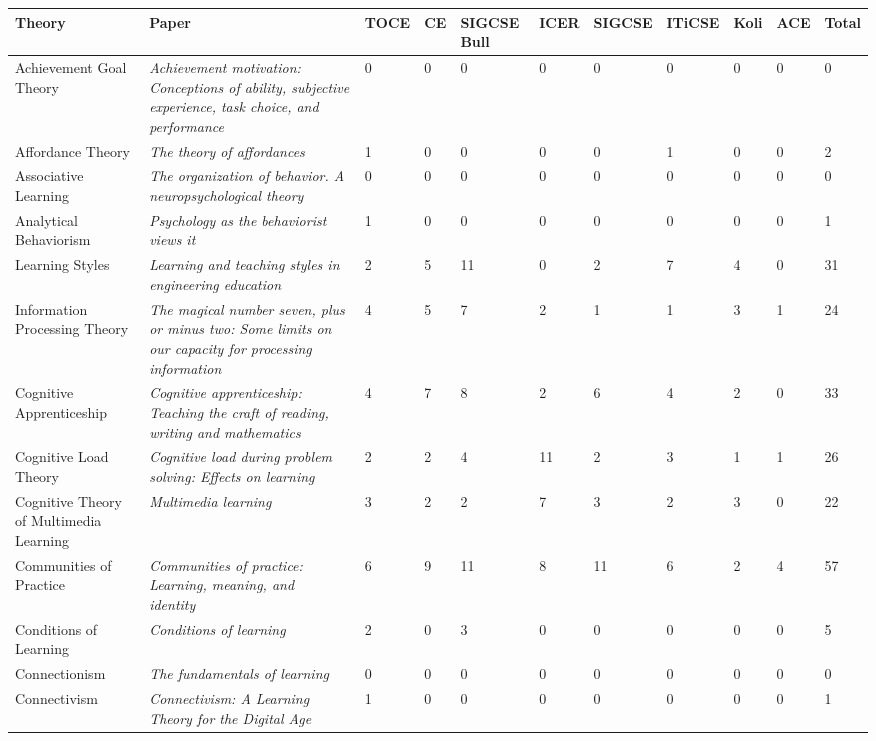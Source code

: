 \begin{table*}[t]
\begin{tabular}{p{3cm}p{5cm}lllllllll}
Theory&Paper&TOCE&CE&SIGCSE Bull&ICER&SIGCSE&ITiCSE&Koli&ACE&Total\\\hline
Achievement Goal Theory & \textit{Achievement motivation: Conceptions of ability, subjective experience, task choice, and performance}~\cite{nicholls1984achievement} & 0 & 0 & 0 & 0 & 0 & 0 & 0 & 0 & 0\\
Affordance Theory & \textit{The theory of affordances}~\cite{gibson1977theory} & 1 & 0 & 0 & 0 & 0 & 1 & 0 & 0 & 2\\
Associative Learning & \textit{The organization of behavior. A neuropsychological theory}~\cite{hebb1949organization} & 0 & 0 & 0 & 0 & 0 & 0 & 0 & 0 & 0\\
Analytical Behaviorism & \textit{Psychology as the behaviorist views it}~\cite{watson1913psychology} & 1 & 0 & 0 & 0 & 0 & 0 & 0 & 0 & 1\\
Learning Styles & \textit{Learning and teaching styles in engineering education}~\cite{felder1988learning} & 2 & 5 & 11 & 0 & 2 & 7 & 4 & 0 & 31\\
Information Processing Theory & \textit{The magical number seven, plus or minus two: Some limits on our capacity for processing information}~\cite{miller1956magical} & 4 & 5 & 7 & 2 & 1 & 1 & 3 & 1 & 24\\
Cognitive Apprenticeship & \textit{Cognitive apprenticeship: Teaching the craft of reading, writing and mathematics}~\cite{collins1988cognitive} & 4 & 7 & 8 & 2 & 6 & 4 & 2 & 0 & 33\\
Cognitive Load Theory & \textit{Cognitive load during problem solving: Effects on learning}~\cite{sweller1988cognitive} & 2 & 2 & 4 & 11 & 2 & 3 & 1 & 1 & 26\\
Cognitive Theory of Multimedia Learning & \textit{Multimedia learning}~\cite{mayer2002multimedia} & 3 & 2 & 2 & 7 & 3 & 2 & 3 & 0 & 22\\
Communities of Practice & \textit{Communities of practice: Learning, meaning, and identity}~\cite{wenger1999communities} & 6 & 9 & 11 & 8 & 11 & 6 & 2 & 4 & 57\\
Conditions of Learning & \textit{Conditions of learning}~\cite{gagne1965conditions} & 2 & 0 & 3 & 0 & 0 & 0 & 0 & 0 & 5\\
Connectionism & \textit{The fundamentals of learning}~\cite{thorndike1932fundamentals} & 0 & 0 & 0 & 0 & 0 & 0 & 0 & 0 & 0\\
Connectivism & \textit{Connectivism: A Learning Theory for the Digital Age}~\cite{siemens2004connectivism} & 1 & 0 & 0 & 0 & 0 & 0 & 0 & 0 & 1\\

\end{tabular}
\end{table*}
